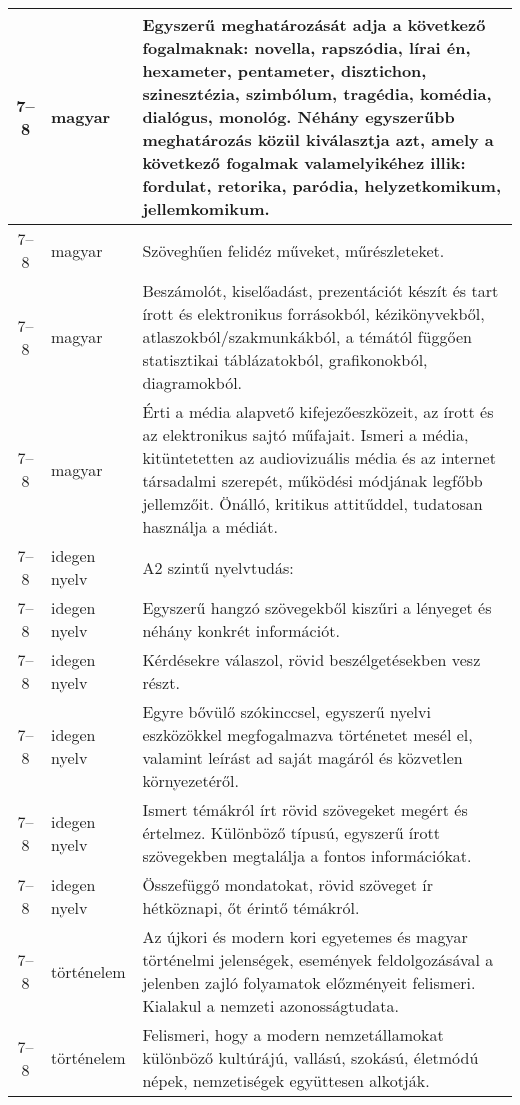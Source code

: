 \begin{small}
\begin{longtable}{c | p{2cm} |  p{11cm} }
              7--8 & magyar & Egyszerű meghatározását adja a következő fogalmaknak: novella, rapszódia, lírai én, hexameter, pentameter, disztichon, szinesztézia, szimbólum, tragédia, komédia, dialógus, monológ. Néhány egyszerűbb meghatározás közül kiválasztja azt, amely a következő fogalmak valamelyikéhez illik: fordulat, retorika, paródia, helyzetkomikum, jellemkomikum. \\ \hline
              7--8 & magyar & Szöveghűen felidéz műveket, műrészleteket. \\ \hline
              7--8 & magyar & Beszámolót, kiselőadást, prezentációt készít és tart írott és elektronikus forrásokból, kézikönyvekből, atlaszokból/szakmunkákból, a témától függően statisztikai táblázatokból, grafikonokból, diagramokból. \\ \hline
              7--8 & magyar & Érti a média alapvető kifejezőeszközeit, az írott és az elektronikus sajtó műfajait. Ismeri a média, kitüntetetten az audiovizuális média és az internet társadalmi szerepét, működési módjának legfőbb jellemzőit. Önálló, kritikus attitűddel, tudatosan használja a médiát. \\ \hline
              7--8 & idegen nyelv & A2 szintű nyelvtudás: \\ \hline
              7--8 & idegen nyelv & Egyszerű hangzó szövegekből kiszűri a lényeget és néhány konkrét információt. \\ \hline
              7--8 & idegen nyelv & Kérdésekre válaszol, rövid beszélgetésekben vesz részt. \\ \hline
              7--8 & idegen nyelv & Egyre bővülő szókinccsel, egyszerű nyelvi eszközökkel megfogalmazva történetet mesél el, valamint leírást ad saját magáról és közvetlen környezetéről. \\ \hline
              7--8 & idegen nyelv & Ismert témákról írt rövid szövegeket megért és értelmez. Különböző típusú, egyszerű írott szövegekben megtalálja a fontos információkat. \\ \hline
              7--8 & idegen nyelv & Összefüggő mondatokat, rövid szöveget ír hétköznapi, őt érintő témákról. \\ \hline
              7--8 & történelem & Az újkori és modern kori egyetemes és magyar történelmi jelenségek, események feldolgozásával a jelenben zajló folyamatok előzményeit felismeri. Kialakul a nemzeti azonosságtudata. \\ \hline
              7--8 & történelem & Felismeri, hogy a modern nemzetállamokat különböző kultúrájú, vallású, szokású, életmódú népek, nemzetiségek együttesen alkotják. \\ \hline

\end{longtable}
\end{small}
